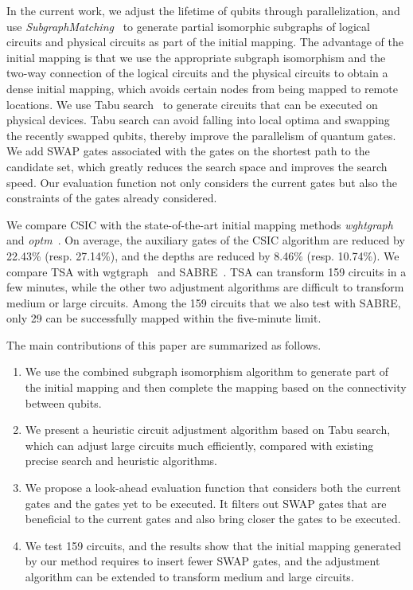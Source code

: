 \documentclass[journal]{IEEEtran}
\begin{document}
In the current work, we adjust the lifetime of qubits through parallelization, and use \emph{SubgraphMatching}~\cite{Sun2020} to generate partial isomorphic subgraphs of logical circuits %
and physical circuits %
as part of the initial mapping. The advantage of the initial mapping is that we use the appropriate subgraph isomorphism and the two-way connection of the logical circuits and the physical circuits to obtain a dense initial mapping, which avoids certain nodes from being mapped to remote locations. We use Tabu search~\cite{Glover1990} to generate circuits that can be executed on physical devices. Tabu search can avoid falling into local optima and swapping the recently swapped qubits, thereby improve the parallelism of quantum gates. We add SWAP gates associated with the gates on the shortest path to the candidate set, which greatly reduces the search space and improves the search speed. Our evaluation function not only considers the current gates but also the constraints of the gates already considered.

We compare CSIC with the state-of-the-art initial mapping methods \emph{wghtgraph}~\cite{2020Qubit} and \emph{optm}~\cite{Zulehner2017}. On average, the auxiliary gates of the CSIC algorithm are reduced by 22.43\% (resp. 27.14\%), and the depths are reduced by 8.46\% (resp. 10.74\%). We compare TSA with wgtgraph~\cite{2020Qubit} and SABRE~\cite{Li2018}. TSA can transform 159 circuits in a few minutes, while the  other two adjustment algorithms are difficult to transform medium or large circuits.  Among the 159 circuits that we also test with SABRE, only 29  can be successfully mapped within the five-minute limit.

The main contributions of this paper are summarized as follows.
	\begin{enumerate}
	\item We use the combined subgraph isomorphism algorithm to generate part of the initial mapping
    and then complete the mapping based on the connectivity between qubits.  
	\item We present a heuristic circuit adjustment algorithm based on Tabu search, which can adjust large circuits much efficiently, compared with existing precise search and heuristic algorithms.
	\item  We propose a look-ahead evaluation function that considers both the current gates and the  gates yet to be executed. It filters out SWAP gates that are beneficial to the current gates and also bring closer the gates to be executed.
	\item We test 159 circuits, and the results show that the initial mapping generated by our method requires to insert fewer SWAP gates, and the adjustment algorithm can be extended to transform medium and large circuits.
	\end{enumerate}
\end{document}
